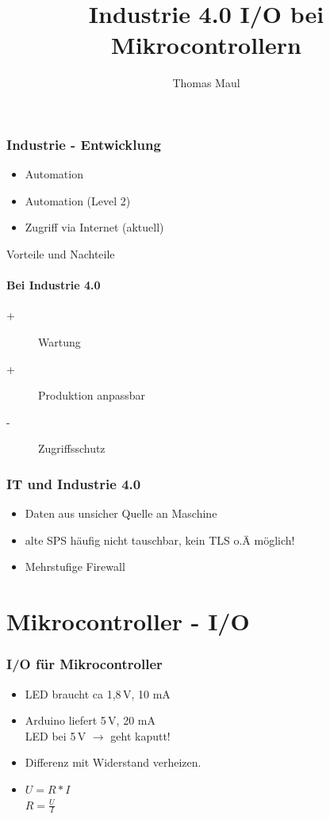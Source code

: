 \documentclass[aspectratio=169]{beamer}
\title{Industrie 4.0 I/O bei Mikrocontrollern}
\author{Thomas Maul}
\institute[BWS Hofheim]{Brühlwiesenschule, Hofheim}
\begin{document}
\begin{frame}
  \titlepage
\end{frame}
\begin{frame}
  \frametitle{Industrie - Entwicklung}
  \begin{itemize}
      \item Automation
      \item Automation (Level 2)
      \item Zugriff via Internet (aktuell)
  \end{itemize}
\end{frame}

\begin{frame}{Vorteile und Nachteile}
  \framesubtitle{Bei Industrie 4.0}
    \begin{description} 
        \item[+] Wartung
        \item[+] Produktion anpassbar 
        \item[-] Zugriffsschutz 
    \end{description}
\end{frame}

\begin{frame}
  \frametitle{IT und Industrie 4.0}
  \begin{itemize}
    \item Daten aus unsicher Quelle an Maschine
    \item alte SPS häufig nicht tauschbar, kein TLS o.Ä möglich!
    \item Mehrstufige Firewall
  \end{itemize}
\end{frame}
\section{Mikrocontroller - I/O}
\begin{frame}
  \frametitle{I/O für Mikrocontroller}
  \begin{itemize}
      \item LED braucht ca 1,8\,V, 10 mA
      \item Arduino liefert 5\,V, 20 mA\\ LED bei 5\,V $\rightarrow$ geht kaputt!
      \item Differenz mit Widerstand verheizen.
      \item $U = R * I$\\ $R = \frac{U}{I}$
  \end{itemize}
\end{frame}
\end{document}
